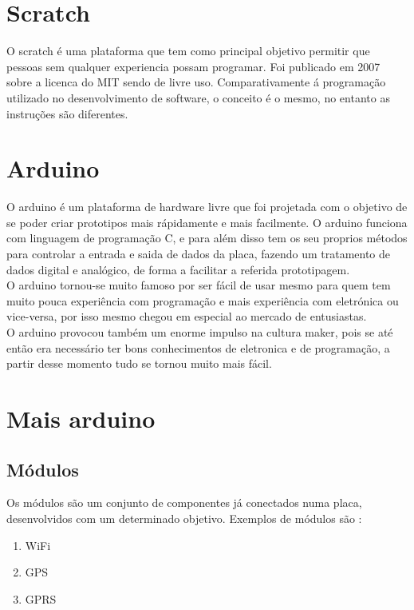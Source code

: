﻿\documentclass{article}
\begin{document}
\section{Scratch}
O scratch é uma plataforma que tem como principal objetivo permitir que pessoas sem qualquer experiencia possam programar. Foi publicado em 2007 sobre a licenca do MIT sendo de livre uso.\newline
Comparativamente á programação utilizado no desenvolvimento de software, o conceito é o mesmo, no entanto as instruções são diferentes.

\section{Arduino}
O arduino é um plataforma de hardware livre que foi projetada com o objetivo de se poder criar prototipos mais rápidamente e mais facilmente. O arduino funciona com linguagem de programação C, e para além disso tem os seu proprios métodos para controlar a entrada e saida de dados da placa, fazendo um tratamento de dados digital e analógico, de forma a facilitar a referida prototipagem.\newline \\
O arduino tornou-se muito famoso por ser fácil de usar mesmo para quem tem muito pouca experiência com programação e mais experiência com eletrónica ou vice-versa, por isso mesmo chegou em especial ao mercado de entusiastas.\newline \\
O arduino provocou também um enorme impulso na cultura maker, pois se até então era necessário ter bons conhecimentos de eletronica e de programação, a partir desse momento tudo se tornou muito mais fácil.\newline \\

\section{Mais arduino}

\subsection{Módulos}
Os módulos são um conjunto de componentes já conectados numa placa, desenvolvidos com um determinado objetivo. Exemplos de módulos são :
\begin{enumerate}
\item WiFi
\item GPS
\item GPRS
\end{enumerate}
\end{document}
